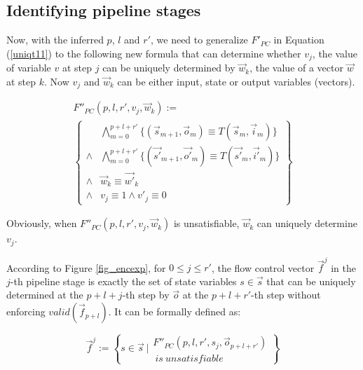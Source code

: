 \documentclass[conference]{IEEEtran}
\begin{document}



\subsection{Identifying pipeline stages}\label{subsec_inferstage}

Now,
with the inferred $p$, $l$ and $r'$,
we need to generalize $F'_{PC}$ in Equation (\ref{uniqt11}) to the following new formula that
can determine whether $v_j$,
the value of variable $v$ at step $j$
can be uniquely determined by $\vec{w}_k$,
the value of a vector $\vec{w}$ at step $k$.
Now $v_j$ and $\vec{w}_k$ can be either input, state or output variables (vectors).

\begin{multline}\label{uniqt2}
F''_{PC}(p,l,r',v_j,\vec{w}_k):=\\
\left\{
\begin{array}{cc}
&\bigwedge_{m=0}^{p+l+r'}
\{
(\vec{s}_{m+1},\vec{o}_m)\equiv T(\vec{s}_m,\vec{i}_m)
\}
\\
\wedge&\bigwedge_{m=0}^{p+l+r'}
\{
(\vec{s'}_{m+1},\vec{o'}_m)\equiv T(\vec{s'}_m,\vec{i'}_m)
\}
\\
\wedge&\vec{w}_{k}\equiv \vec{w'}_{k} \\
\wedge& v_{j}\equiv 1 \wedge  v'_{j}\equiv 0 
\end{array}
\right\}
\end{multline}

Obviously,
when $F''_{PC}(p,l,r',v_j,\vec{w}_k)$ is unsatisfiable,
$\vec{w}_k$ can uniquely determine $v_j$.

According to Figure \ref{fig_encexp},
for $0\le j\le r'$,
the flow control vector $\vec{f}^j$ in the $j$-th pipeline stage
is exactly the set of state variables $s\in \vec{s}$ 
that can be uniquely determined at the $p+l+j$-th step by $\vec{o}$ 
at the $p+l+r'$-th step without enforcing $valid(\vec{f}_{p+l})$.
It can be formally defined as:

\begin{equation}\label{stgn_fj}
\vec{f}^{j} := 
 \left\{
 s\in \vec{s} ~| 
\begin{array}{cc}
 F''_{PC}(p,l,r',s_j,\vec{o}_{p+l+r'})\\
 ~is~unsatisfiable
\end{array}
\right\}
\end{equation}
\end{document}
